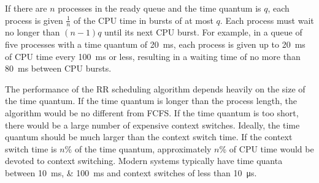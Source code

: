 If there are \( n \) processes in the ready queue and the time quantum is \( q \), each process is given \( \frac{1}{n} \) of the CPU time in bursts of at most \( q \).
Each process must wait no longer than \( \left( n - 1 \right) q \) until its next CPU burst.
For example, in a queue of five processes with a time quantum of \SI{20}{\milli\second}, each process is given up to \SI{20}{\milli\second} of CPU time every \SI{100}{\milli\second} or less, resulting in a waiting time of no more than \SI{80}{\milli\second} between CPU bursts.

The performance of the RR scheduling algorithm depends heavily on the size of the time quantum.
If the time quantum is longer than the process length, the algorithm would be no different from FCFS\@.
If the time quantum is too short, there would be a large number of expensive context switches.
Ideally, the time quantum should be much larger than the context switch time.
If the context switch time is \( n \)\si{\percent} of the time quantum, approximately \( n \)\si{\percent} of CPU time would be devoted to context switching.
Modern systems typically have time quanta between \SIlist{10;100}{\milli\second} and context switches of less than \SI{10}{\micro\second}.
